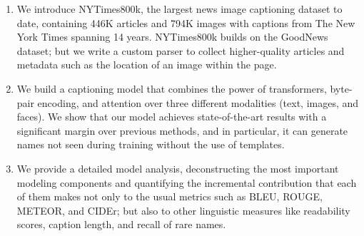 \begin{enumerate}
   \item We introduce NYTimes800k, the largest news image captioning dataset to
   date, containing 446K articles and 794K images with captions from The New
   York Times spanning 14 years. NYTimes800k builds on the GoodNews dataset;
   but we write a custom parser to collect higher-quality articles and metadata
   such as the location of an image within the page.

   \item We build a captioning model that combines the power of transformers,
   byte-pair encoding, and attention over three different modalities (text,
   images, and faces). We show that our model achieves state-of-the-art results
   with a significant margin over previous methods, and in particular, it can
   generate names not seen during training without the use of templates.

   \item We provide a detailed model analysis, deconstructing the most
   important modeling components and quantifying the incremental contribution
   that each of them makes not only to the usual metrics such as BLEU, ROUGE,
   METEOR, and CIDEr; but also to other linguistic measures like readability
   scores, caption length, and recall of rare names.
\end{enumerate}
